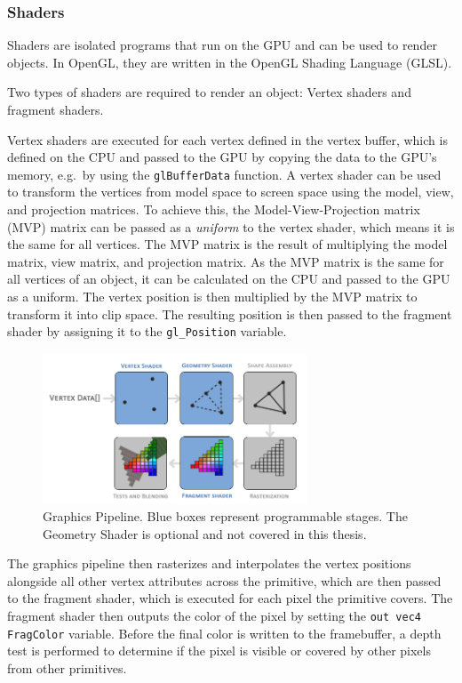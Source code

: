 \subsubsection{Shaders}\label{subsec:shaders}
Shaders are isolated programs that run on the GPU and can be used to render objects.
In OpenGL, they are written in the OpenGL Shading Language (GLSL).

Two types of shaders are required to render an object: Vertex shaders and fragment shaders.

Vertex shaders are executed for each vertex defined in the vertex buffer, which is defined on the CPU and
passed to the GPU by copying the data to the GPU's memory, e.g.\ by using the \texttt{glBufferData} function.
A vertex shader can be used to transform the vertices from model space to screen space using the
model, view, and projection matrices.
To achieve this, the Model-View-Projection matrix (MVP) matrix can be passed as a \textit{uniform} to the vertex shader,
which means it is the same for all vertices.
The MVP matrix is the result of multiplying the model matrix, view matrix, and projection matrix.
As the MVP matrix is the same for all vertices of an object, it can be calculated on the CPU and passed to the GPU as a uniform.
The vertex position is then multiplied by the MVP matrix to transform it into clip space.
The resulting position is then passed to the fragment shader by assigning it to the \texttt{gl\_Position} variable.

\begin{figure}[h]
    \centering
    \includegraphics[width=0.70\textwidth]{images/graphics-pipeline}
    \caption{Graphics Pipeline. Blue boxes represent programmable stages. The Geometry Shader is optional and not covered in this thesis.}
    \label{fig:graphics-pipeline}
\end{figure}


The graphics pipeline then rasterizes and interpolates the vertex positions alongside all other vertex attributes
across the primitive, which are then passed to the fragment shader, which is executed for each pixel the primitive covers.
The fragment shader then outputs the color of the pixel by setting the \texttt{out vec4 FragColor} variable.
Before the final color is written to the framebuffer,
a depth test is performed to determine if the pixel is visible or covered by other pixels from other primitives.

